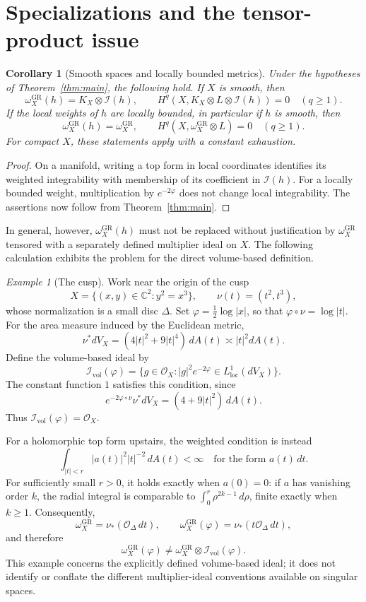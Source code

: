 \documentclass[11pt,a4paper,reqno]{amsart}
\newtheorem{corollary}[theorem]{Corollary}
\theoremstyle{definition}
\theoremstyle{remark}
\newtheorem{example}[theorem]{Example}
\numberwithin{equation}{section}
\newcommand{\OO}{\mathcal O}
\newcommand{\II}{\mathcal I}
\newcommand{\GR}{\mathrm{GR}}
\newcommand{\loc}{\mathrm{loc}}
\newcommand{\vol}{\mathrm{vol}}
\newcommand{\wGR}{\omega_X^{\GR}}
\begin{document}
\section{Specializations and the tensor-product issue}

\begin{corollary}[Smooth spaces and locally bounded metrics]
Under the hypotheses of Theorem~\ref{thm:main}, the following hold.
If $X$ is smooth, then
\[
 \wGR(h)=K_X\otimes\II(h),\qquad
 H^q(X,K_X\otimes L\otimes\II(h))=0\quad(q\geq1).
\]
If the local weights of $h$ are locally bounded, in particular if $h$ is
smooth, then
\[
 \wGR(h)=\wGR,\qquad
 H^q(X,\wGR\otimes L)=0\quad(q\geq1).
\]
For compact $X$, these statements apply with a constant exhaustion.
\end{corollary}

\begin{proof}
On a manifold, writing a top form in local coordinates identifies its
weighted integrability with membership of its coefficient in $\II(h)$.
For a locally bounded weight, multiplication by $e^{-2\varphi}$ does
not change local integrability. The assertions now follow from
Theorem~\ref{thm:main}.
\end{proof}

In general, however, $\wGR(h)$ must not be replaced without justification
by $\wGR$ tensored with a separately defined multiplier ideal on $X$.
The following calculation exhibits the problem for the direct
volume-based definition.

\begin{example}[The cusp]\label{ex:cusp}
Work near the origin of the cusp
\[
 X=\{(x,y)\in\mathbb C^2:y^2=x^3\},
 \qquad\nu(t)=(t^2,t^3),
\]
whose normalization is a small disc $\Delta$. Set
$\varphi=\tfrac12\log|x|$, so that $\varphi\circ\nu=\log|t|$.
For the area measure induced by the Euclidean metric,
\[
 \nu^*dV_X=(4|t|^2+9|t|^4)\,dA(t)\asymp|t|^2dA(t).
\]
Define the volume-based ideal by
\[
 \II_{\vol}(\varphi)=
 \{g\in\OO_X:|g|^2e^{-2\varphi}\in L^1_{\loc}(dV_X)\}.
\]
The constant function $1$ satisfies this condition, since
\[
 e^{-2\varphi\circ\nu}\nu^*dV_X
 =(4+9|t|^2)\,dA(t).
\]
Thus $\II_{\vol}(\varphi)=\OO_X$.

For a holomorphic top form upstairs, the weighted condition is instead
\[
 \int_{|t|<r} |a(t)|^2|t|^{-2}\,dA(t)<\infty
 \quad\text{for the form }a(t)\,dt.
\]
For sufficiently small $r>0$, it holds exactly when $a(0)=0$: if $a$ has
vanishing order $k$, the radial
integral is comparable to $\int_0^r\rho^{2k-1}\,d\rho$, finite exactly
when $k\geq1$. Consequently,
\[
 \wGR=\nu_*(\OO_\Delta\,dt),\qquad
 \wGR(\varphi)=\nu_*(t\OO_\Delta\,dt),
\]
and therefore
\begin{equation}\label{eq:cusp-inequality}
 \wGR(\varphi)\ne\wGR\otimes\II_{\vol}(\varphi).
\end{equation}
This example concerns the explicitly defined volume-based ideal; it does
not identify or conflate the different multiplier-ideal conventions
available on singular spaces.
\end{example}
\end{document}
